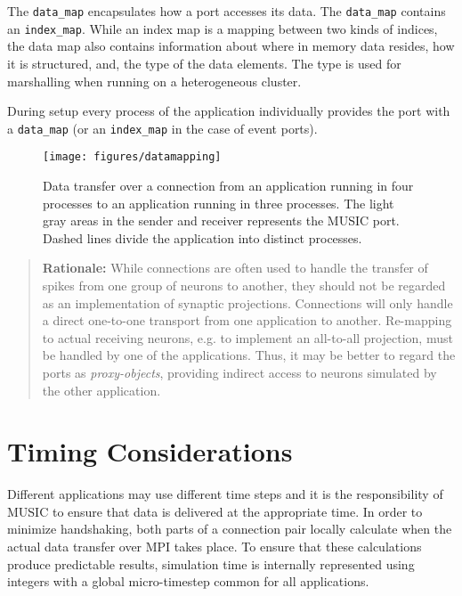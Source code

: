 \documentclass[a4paper,twoside]{report}
\newenvironment{rationale}%
{\par\begin{quote}\textbf{Rationale:}}%
{\par\end{quote}}
\begin{document}
The \lstinline|data_map| encapsulates how a port accesses its data.
The \lstinline|data_map| contains an \lstinline|index_map|.  While an
index map is a mapping between two kinds of indices, the data map also
contains information about where in memory data resides, how it is
structured, and, the type of the data elements.  The type is used for
marshalling when running on a heterogeneous cluster.

During setup every process of the application individually provides
the port with a \lstinline|data_map| (or an \lstinline|index_map| in
the case of event ports).

\begin{figure}
  \begin{center}
    \texttt{[image: figures/datamapping]}
    \caption[Mapping of data]{\label{fig:datamapping} Data transfer
      over a connection from an application running in four processes
      to an application running in three processes.  The light gray
      areas in the sender and receiver represents the MUSIC port.
      Dashed lines divide the application into distinct processes.  }
  \end{center}
\end{figure}

\begin{rationale}
  While connections are often used to handle the transfer of spikes
  from one group of neurons to another, they should not be regarded as
  an implementation of synaptic projections.
  Connections will only handle a direct one-to-one transport from one
  application to another.  Re-mapping to actual receiving neurons,
  e.g. to implement an all-to-all projection, must be handled by one
  of the applications.  Thus, it may be better to regard the ports as
  \emph{proxy-objects}, providing indirect access
  to neurons simulated by the other application.
\end{rationale}


\section{Timing Considerations}
\label{sec:timing}
  
Different applications may use different time steps and it is the
responsibility of MUSIC to ensure that data is delivered at the
appropriate time.  In order to minimize handshaking, both parts of a
connection pair locally calculate when the actual data transfer over
MPI takes place.  To ensure that these calculations produce
predictable results, simulation time is internally represented using
integers with a global micro-timestep common for
all applications.
\end{document}
